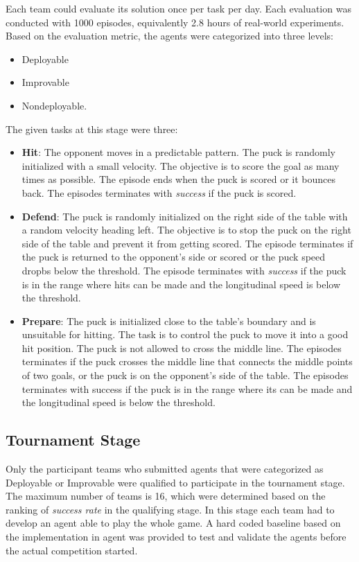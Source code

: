 Each team could evaluate its solution once per task per day. Each evaluation was conducted with 1000 episodes, equivalently 2.8 hours of real-world experiments.
Based on the evaluation metric, the agents were categorized into three levels:
\begin{itemize}
    \item Deployable
    \item Improvable
    \item Nondeployable.
\end{itemize}

The given tasks at this stage were three:

\begin{itemize}
    \item \textbf{Hit}: The opponent moves in a predictable pattern. The puck is randomly initialized with a small velocity. The objective is to score the goal as many times as possible.
    The episode ends when the puck is scored or it bounces back. The episodes terminates with \textit{success} if the puck is scored.
    \item \textbf{Defend}: The puck is randomly initialized on the right side of the table with a random velocity heading left.
    The objective is to stop the puck on the right side of the table and prevent it from getting scored.
    The episode terminates if the puck is returned to the opponent's side or scored or the puck speed dropbs below the threshold.
    The episode terminates with \textit{success} if the puck is in the range where hits can be made and the longitudinal speed is below the threshold.
    \item \textbf{Prepare}: The puck is initialized close to the table's boundary and is unsuitable for hitting. The task is to control the puck to move it into a good hit position. The puck is not allowed to cross the middle line.
    The episodes terminates if the puck crosses the middle line that connects the middle points of two goals, or the puck is on the opponent's side of the table.
    The episodes terminates with success if the puck is in the range where its can be made and the longitudinal speed is below the threshold.
\end{itemize}

\subsection{Tournament Stage}
Only the participant teams who submitted agents that were categorized as Deployable or Improvable were qualified to participate in the tournament stage.
The maximum number of teams is 16, which were determined based on the ranking of \textit{success rate} in the qualifying stage.
In this stage each team had to develop an agent able to play the whole game.
A hard coded baseline based on the implementation in \cite{baseline} agent was provided to test and validate the agents before the actual competition started. 

